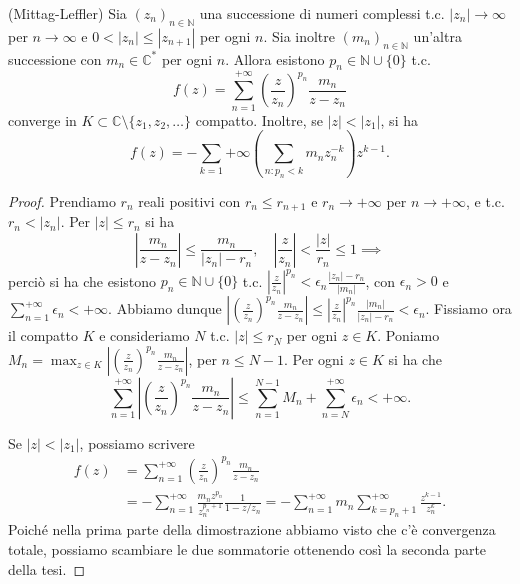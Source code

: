 \begin{lm}
  (Mittag-Leffler) Sia $(z_n)_{n \in \mathbb{N}}$ una successione di numeri complessi t.c. $|z_n| \longrightarrow \infty$ per $n \longrightarrow \infty$ e $0<|z_n| \le |z_{n+1}|$ per ogni $n$. Sia inoltre $(m_n)_{n \in \mathbb{N}}$ un'altra successione con $m_n \in \mathbb{C}^*$ per ogni $n$. Allora esistono $p_n \in \mathbb{N}\cup \{0\}$ t.c.
  $$f(z)=\sum_{n=1}^{+\infty} \left(\frac{z}{z_n}\right)^{p_n}\frac{m_n}{z-z_n}$$
  converge in $K \subset \mathbb{C}\setminus\{z_1, z_2, \dots\}$ compatto. Inoltre, se $|z|<|z_1|$, si ha
  $$f(z)=-\sum_{k=1}{+\infty} \left(\sum_{n:p_n<k}m_nz_n^{-k}\right)z^{k-1}.$$
\end{lm}

\begin{proof}
  Prendiamo $r_n$ reali positivi con $r_n \le r_{n+1}$ e $r_n \longrightarrow +\infty$ per $n \longrightarrow +\infty$, e t.c. $r_n<|z_n|$. Per $|z| \le r_n$ si ha
  $$\left|\frac{m_n}{z-z_n}\right| \le \frac{m_n}{|z_n|-r_n}, \quad \left|\frac{z}{z_n}\right|<\frac{|z|}{r_n} \le 1 \implies$$
  perciò si ha che esistono $p_n \in \mathbb{N}\cup\{0\}$ t.c. $\displaystyle \left|\frac{z}{z_n}\right|^{p_n} <\epsilon_n \frac{|z_n|-r_n}{|m_n|}$, con $\epsilon_n>0$ e $\displaystyle \sum_{n=1}^{+\infty} \epsilon_n<+\infty$.
  Abbiamo dunque $\displaystyle \left|\left(\frac{z}{z_n}\right)^{p_n}\frac{m_n}{z-z_n}\right| \le \left|\frac{z}{z_n}\right|^{p_n} \frac{|m_n|}{|z_n|-r_n}<\epsilon_n$. Fissiamo ora il compatto $K$ e consideriamo $N$ t.c. $|z| \le r_N$ per ogni $z \in K$.
  Poniamo $\displaystyle M_n=\max_{z \in K} \left|\left(\frac{z}{z_n}\right)^{p_n}\frac{m_n}{z-z_n}\right|$, per $n \le N-1$. Per ogni $z \in K$ si ha che
  $$\sum_{n=1}^{+\infty} \left|\left(\frac{z}{z_n}\right)^{p_n}\frac{m_n}{z-z_n}\right| \le \sum_{n=1}^{N-1} M_n+\sum_{n=N}^{+\infty} \epsilon_n<+\infty.$$

  Se $|z|<|z_1|$, possiamo scrivere
  \begin{align*}
    f(z) & =\sum_{n=1}^{+\infty} \left(\frac{z}{z_n}\right)^{p_n}\frac{m_n}{z-z_n} \\
    & =-\sum_{n=1}^{+\infty} \frac{m_nz^{p_n}}{z_n^{p_n+1}}\frac{1}{1-z/z_n}=-\sum_{n=1}^{+\infty}m_n\sum_{k=p_n+1}^{+\infty} \frac{z^{k-1}}{z_n^k}.
  \end{align*}
  Poiché nella prima parte della dimostrazione abbiamo visto che c'è convergenza totale, possiamo scambiare le due sommatorie ottenendo così la seconda parte della tesi.
\end{proof}

